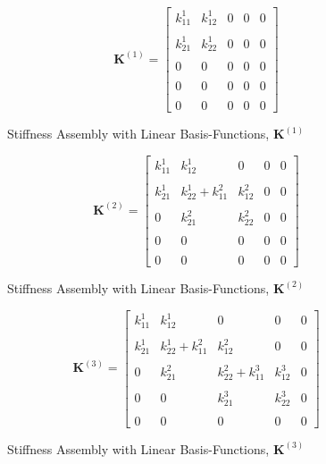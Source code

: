\begin{figure}[H]
	\centering
	\begin{equation*}
		\mathbf{K}^{\left( 1 \right)} =
		\begin{bmatrix}
			k_{11}^{1} & k_{12}^{1} & 0 & 0 & 0 \\ \\
			k_{21}^{1} & k_{22}^{1} & 0 & 0 & 0 \\ \\
			0 & 0 & 0 & 0 & 0 \\ \\
			0 & 0 & 0 & 0 & 0 \\ \\
			0 & 0 & 0 & 0 & 0
		\end{bmatrix}
	\end{equation*}
	\caption{Stiffness Assembly with Linear Basis-Functions, $\mathbf{K}^{\left(1\right)}$ }
	\label{fig:K_1_Linear}
\end{figure}
\begin{figure}[H]
	\centering
	\begin{equation*}
		\mathbf{K}^{\left( 2 \right)} =
		\begin{bmatrix}
			k_{11}^{1} & k_{12}^{1} & 0 & 0 & 0 \\ \\
			k_{21}^{1} & k_{22}^{1} + k_{11}^{2} & k_{12}^{2} & 0 & 0 \\ \\
			0 & k_{21}^{2} & k_{22}^{2}	& 0 & 0 \\ \\
			0 & 0 & 0 & 0 & 0 \\ \\
			0 & 0 & 0 & 0 & 0
		\end{bmatrix}
	\end{equation*}
	\caption{Stiffness Assembly with Linear Basis-Functions, $\mathbf{K}^{\left(2\right)}$ }
	\label{fig:K_2_Linear}
\end{figure}
%
\begin{figure}[H]
	\centering
	\begin{equation*}
		\mathbf{K}^{\left( 3 \right)} =
		\begin{bmatrix}
			k_{11}^{1} & k_{12}^{1} & 0 & 0 & 0 \\ \\
			k_{21}^{1} & k_{22}^{1} + k_{11}^{2} & k_{12}^{2} & 0 & 0 \\ \\
			0 & k_{21}^{2} & k_{22}^{2} + k_{11}^{3} & k_{12}^{3} & 0 \\ \\
			0 & 0 & k_{21}^{3} & k_{22}^{3}	& 0 \\ \\
			0 & 0 & 0 & 0 & 0
		\end{bmatrix}
	\end{equation*}
	\caption{Stiffness Assembly with Linear Basis-Functions, $\mathbf{K}^{\left(3\right)}$ }
	\label{fig:K_3_Linear}
\end{figure}
